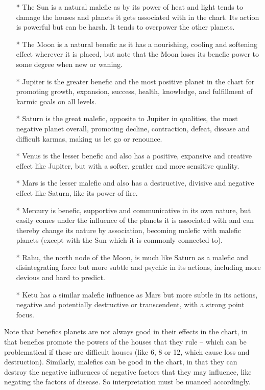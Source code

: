 \begin{enumerate}
\item[*] The Sun is a natural malefic as by its power of heat and light tends to damage the houses and planets it gets associated with in the chart. Its action is powerful but can be harsh. It tends to overpower the other planets.
\item[*] The Moon is a natural benefic as it has a nourishing, cooling and softening effect wherever it is placed, but note that the Moon loses its benefic power to some degree when new or waning.
\item[*] Jupiter is the greater benefic and the most positive planet in the chart for promoting growth, expansion, success, health, knowledge, and fulfillment of karmic goals on all levels.
\item[*] Saturn is the great malefic, opposite to Jupiter in qualities, the most negative planet overall, promoting decline, contraction, defeat, disease and difficult karmas, making us let go or renounce.
\item[*] Venus is the lesser benefic and also has a positive, expansive and creative effect like Jupiter, but with a softer, gentler and more sensitive quality.
\item[*] Mars is the lesser malefic and also has a destructive, divisive and negative effect like Saturn, like its power of fire.
\item[*] Mercury is benefic, supportive and communicative in its own nature, but easily comes under the influence of the planets it is associated with and can thereby change its nature by association, becoming malefic with malefic planets (except with the Sun which it is commonly connected to).
\item[*] Rahu, the north node of the Moon, is much like Saturn as a malefic and disintegrating force but more subtle and psychic in its actions, including more devious and hard to predict.
\item[*] Ketu has a similar malefic influence as Mars but more subtle in its actions, negative and potentially destructive or transcendent, with a strong point focus.
\end{enumerate}

Note that benefics planets are not always good in their effects in the chart, in that benefics promote the powers of the houses that they rule – which can be problematical if these are difficult houses (like 6, 8 or 12, which cause loss and destruction). Similarly, malefics can be good in the chart, in that they can destroy the negative influences of negative factors that they may influence, like negating the factors of disease. So interpretation must be nuanced accordingly.


